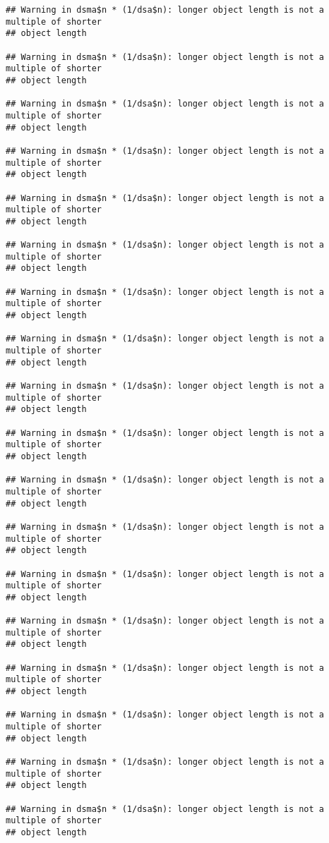 \documentclass[
]{article}
\begin{document}
\begin{verbatim}
## Warning in dsma$n * (1/dsa$n): longer object length is not a multiple of shorter
## object length

## Warning in dsma$n * (1/dsa$n): longer object length is not a multiple of shorter
## object length

## Warning in dsma$n * (1/dsa$n): longer object length is not a multiple of shorter
## object length

## Warning in dsma$n * (1/dsa$n): longer object length is not a multiple of shorter
## object length

## Warning in dsma$n * (1/dsa$n): longer object length is not a multiple of shorter
## object length

## Warning in dsma$n * (1/dsa$n): longer object length is not a multiple of shorter
## object length

## Warning in dsma$n * (1/dsa$n): longer object length is not a multiple of shorter
## object length

## Warning in dsma$n * (1/dsa$n): longer object length is not a multiple of shorter
## object length

## Warning in dsma$n * (1/dsa$n): longer object length is not a multiple of shorter
## object length

## Warning in dsma$n * (1/dsa$n): longer object length is not a multiple of shorter
## object length

## Warning in dsma$n * (1/dsa$n): longer object length is not a multiple of shorter
## object length

## Warning in dsma$n * (1/dsa$n): longer object length is not a multiple of shorter
## object length

## Warning in dsma$n * (1/dsa$n): longer object length is not a multiple of shorter
## object length

## Warning in dsma$n * (1/dsa$n): longer object length is not a multiple of shorter
## object length

## Warning in dsma$n * (1/dsa$n): longer object length is not a multiple of shorter
## object length

## Warning in dsma$n * (1/dsa$n): longer object length is not a multiple of shorter
## object length

## Warning in dsma$n * (1/dsa$n): longer object length is not a multiple of shorter
## object length

## Warning in dsma$n * (1/dsa$n): longer object length is not a multiple of shorter
## object length


\end{verbatim}
\end{document}
